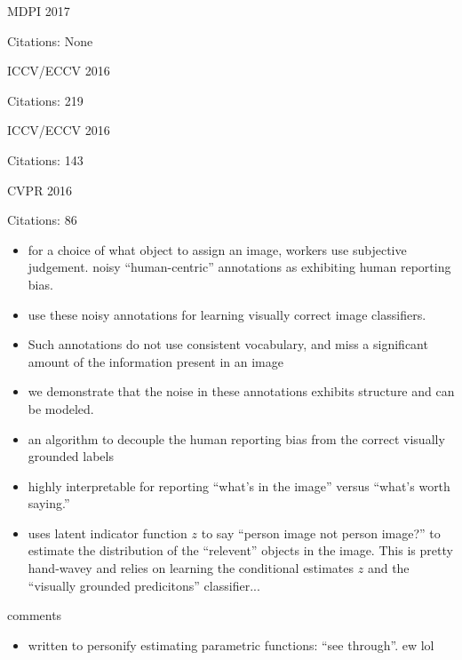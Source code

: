 \documentclass[11pt]{article}
\begin{document}
\noindent MDPI 2017

\noindent Citations: None

\vspace{2cm}

\noindent ICCV/ECCV 2016

\noindent Citations: 219

\vspace{2cm}

\noindent ICCV/ECCV 2016

\noindent Citations: 143

\vspace{2cm}

\noindent CVPR 2016

\noindent Citations: 86

\begin{itemize}
\item for a choice of what object to assign an image, workers use subjective judgement. noisy “human-centric” annotations as exhibiting human reporting bias.
\item use these noisy annotations for learning visually correct image classifiers.
\item  Such annotations do not use consistent vocabulary, and miss a significant amount of the information present in an image
\item we demonstrate that the noise in these annotations exhibits structure and can be modeled.
\item an algorithm to decouple the human reporting bias from the correct visually grounded labels
\item highly interpretable for reporting “what’s in the image” versus “what’s worth saying.”
\item uses latent indicator function $z$ to say ``person image not person image?'' to estimate the distribution of the ``relevent'' objects in the image. This is pretty hand-wavey and relies on learning the conditional estimates $z$ and the ``visually grounded predicitons'' classifier...
\end{itemize}

\noindent comments
\begin{itemize}
\item written to personify estimating parametric functions: ``see through''. ew lol
\end{itemize}
\end{document}
